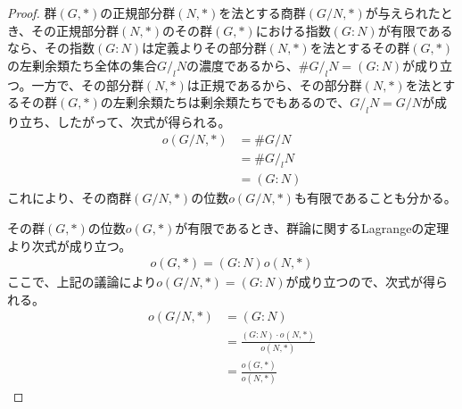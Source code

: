 \documentclass[dvipdfmx]{jsarticle}
\begin{document}
\begin{proof}
群$(G,*)$の正規部分群$(N,*)$を法とする商群$\left( {G}/{N},* \right)$が与えられたとき、その正規部分群$(N,*)$のその群$(G,*)$における指数$(G:N)$が有限であるなら、その指数$(G:N)$は定義よりその部分群$(N,*)$を法とするその群$(G,*)$の左剰余類たち全体の集合${G}/_l {N}$の濃度であるから、$\#{G}/_l {N} = (G:N)$が成り立つ。一方で、その部分群$(N,*)$は正規であるから、その部分群$(N,*)$を法とするその群$(G,*)$の左剰余類たちは剰余類たちでもあるので、${G}/_l {N} = {G}/{N}$が成り立ち、したがって、次式が得られる。
\begin{align*}
o\left( {G}/{N},* \right) &= \#{G}/{N}\\
&= \#{G}/_l {N}\\
&= (G:N)
\end{align*}
これにより、その商群$\left( {G}/{N},* \right)$の位数$o\left( {G}/{N},* \right)$も有限であることも分かる。\par
その群$(G,*)$の位数$o(G,*)$が有限であるとき、群論に関するLagrangeの定理より次式が成り立つ。
\begin{align*}
o(G,*) = (G:N)o(N,*)
\end{align*}
ここで、上記の議論により$o\left( {G}/{N},* \right) = (G:N)$が成り立つので、次式が得られる。
\begin{align*}
o\left( {G}/{N},* \right) &= (G:N)\\
&= \frac{(G:N) \cdot o(N,*)}{o(N,*)}\\
&= \frac{o(G,*)}{o(N,*)}
\end{align*}
\end{proof}
\end{document}
